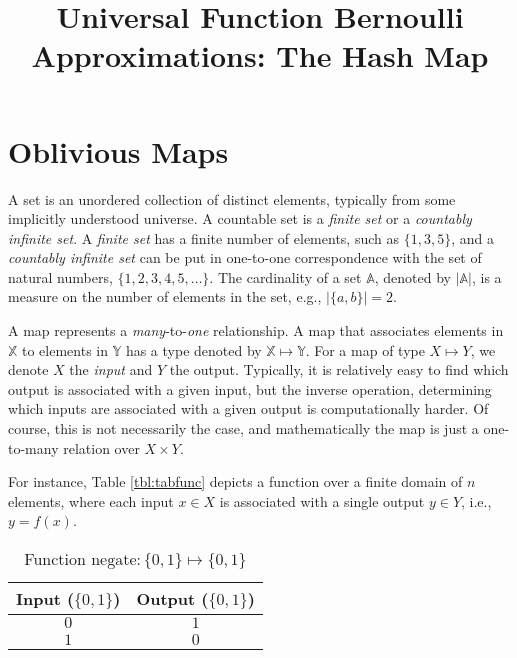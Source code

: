 \documentclass[
  letterpaper,
  DIV=11,
  numbers=noendperiod]{scrartcl}
\title{Universal Function Bernoulli Approximations: The Hash Map}
\author{}
\date{}
\renewcommand*\contentsname{Table of contents}
\newcommand\contentsname{Table of contents}
\theoremstyle{remark}
\begin{document}
\maketitle

\renewcommand*\contentsname{Table of contents}
{
\hypersetup{linkcolor=}
\setcounter{tocdepth}{3}
\tableofcontents
}

\section{Oblivious Maps}\label{sec:map}

A set is an unordered collection of distinct elements, typically from
some implicitly understood universe. A countable set is a \emph{finite
set} or a \emph{countably infinite set}. A \emph{finite set} has a
finite number of elements, such as \(\{ 1, 3, 5 \}\), and a
\emph{countably infinite set} can be put in one-to-one correspondence
with the set of natural numbers, \(\{1,2,3,4,5,\ldots\}\). The
cardinality of a set \(\mathbb{A}\), denoted by \(|\mathbb{A}|\), is a
measure on the number of elements in the set, e.g., \(|\{a,b\}|=2\).

A map represents a \emph{many}-to-\emph{one} relationship. A map that
associates elements in \(\mathbb{X}\) to elements in \(\mathbb{Y}\) has
a type denoted by \(\mathbb{X}\mapsto\mathbb{Y}\). For a map of type
\(X \mapsto Y\), we denote \(X\) the \emph{input} and \(Y\) the output.
Typically, it is relatively easy to find which output is associated with
a given input, but the inverse operation, determining which inputs are
associated with a given output is computationally harder. Of course,
this is not necessarily the case, and mathematically the map is just a
one-to-many relation over \(X \times Y\).

For instance, Table \ref{tbl:tabfunc} depicts a function over a finite
domain of \(n\) elements, where each input \(x \in X\) is associated
with a single output \(y \in Y\), i.e., \(y = f(x)\).

\begin{table}
    \centering
    \caption{Function $\mathrm{negate} \colon \{0,1\} \mapsto \{0,1\}$}
    
    \begin{tabular}{|c c|} 
        \hline
        Input ($\{0,1\}$) & Output ($\{0,1\}$)\\
        \hline
        $0$ & $1$\\
        $1$ & $0$\\    
        \hline
    \end{tabular}
\end{table}
\end{document}
